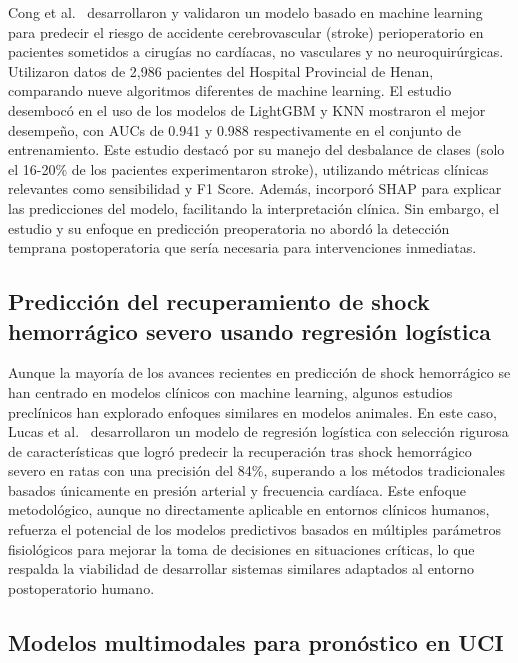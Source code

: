 Cong et al.\ \cite{cong2025} desarrollaron y validaron un modelo basado en machine learning para predecir el riesgo de accidente cerebrovascular (stroke) perioperatorio en pacientes sometidos a cirugías no cardíacas, no vasculares y no neuroquirúrgicas. Utilizaron datos de 2,986 pacientes del Hospital Provincial de Henan, comparando nueve algoritmos diferentes de machine learning. El estudio desembocó en el uso de los modelos de LightGBM y KNN mostraron el mejor desempeño, con AUCs de 0.941 y 0.988 respectivamente en el conjunto de entrenamiento. Este estudio destacó por su manejo del desbalance de clases (solo el 16-20\% de los pacientes experimentaron stroke), utilizando métricas clínicas relevantes como sensibilidad y F1 Score. Además, incorporó SHAP para explicar las predicciones del modelo, facilitando la interpretación clínica. Sin embargo, el estudio y su enfoque en predicción preoperatoria no abordó la detección temprana postoperatoria que sería necesaria para intervenciones inmediatas.

\subsection{Predicción del recuperamiento de shock hemorrágico severo usando regresión logística}

Aunque la mayoría de los avances recientes en predicción de shock hemorrágico se han centrado en modelos clínicos con machine learning, algunos estudios preclínicos han explorado enfoques similares en modelos animales. En este caso, Lucas et al.\ \cite{lucas2019} desarrollaron un modelo de regresión logística con selección rigurosa de características que logró predecir la recuperación tras shock hemorrágico severo en ratas con una precisión del 84\%, superando a los métodos tradicionales basados únicamente en presión arterial y frecuencia cardíaca. Este enfoque metodológico, aunque no directamente aplicable en entornos clínicos humanos, refuerza el potencial de los modelos predictivos basados en múltiples parámetros fisiológicos para mejorar la toma de decisiones en situaciones críticas, lo que respalda la viabilidad de desarrollar sistemas similares adaptados al entorno postoperatorio humano.

\subsection{Modelos multimodales para pronóstico en UCI}

